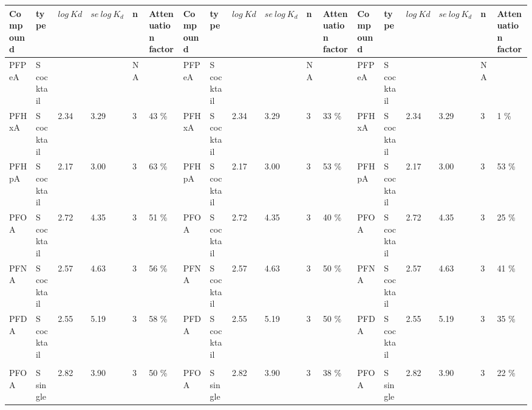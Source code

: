 \begin{sidewaystable}
{\begin{threeparttable}
\begin{tabular}{llllllllllllllllll}
         \cmidrule(l){3-6} \cmidrule(l){9-12} \cmidrule(l){15-18}
Compound & type           & $log~Kd$ & $se~log~K_d$ & n  & Attenuation factor                   & Compound & type           & $log~Kd$ & $se~log~K_d$ & n  & Attenuation factor                    & Compound & type           & $log~Kd$ & $se~log~K_d$ & n  & Attenuation factor                   \\ \midrule
PFPeA    & S cocktail    &        &           & NA &                                & PFPeA    & S cocktail    &        &           & NA &                                & PFPeA    & S cocktail    &        &           & NA &                                \\
PFHxA    & S cocktail    & 2.34   & 3.29      & 3  & 43 \%                          & PFHxA    & S cocktail    & 2.34   & 3.29      & 3  & 33 \%                          & PFHxA    & S cocktail    & 2.34   & 3.29      & 3  & 1 \%                           \\
PFHpA    & S cocktail    & 2.17   & 3.00      & 3  & 63 \%                          & PFHpA    & S cocktail    & 2.17   & 3.00      & 3  & 53 \%                          & PFHpA    & S cocktail    & 2.17   & 3.00      & 3  & 53 \%                          \\
PFOA     & S cocktail    & 2.72   & 4.35      & 3  & 51 \%                          & PFOA     & S cocktail    & 2.72   & 4.35      & 3  & 40 \%                          & PFOA     & S cocktail    & 2.72   & 4.35      & 3  & 25 \%                          \\
PFNA     & S cocktail    & 2.57   & 4.63      & 3  & 56 \%                          & PFNA     & S cocktail    & 2.57   & 4.63      & 3  & 50 \%                          & PFNA     & S cocktail    & 2.57   & 4.63      & 3  & 41 \%                          \\
PFDA     & S cocktail    & 2.55   & 5.19      & 3  & 58 \%                          & PFDA     & S cocktail    & 2.55   & 5.19      & 3  & 50 \%                          & PFDA     & S cocktail    & 2.55   & 5.19      & 3  & 35 \%                          \\
         &                &        &           &    &                                &          &                &        &           &    &                                &          &                &        &           &    &                                \\
PFOA     & S single       & 2.82   & 3.90      & 3  & 50 \%                          & PFOA     & S single       & 2.82   & 3.90      & 3  & 38 \%                          & PFOA     & S single       & 2.82   & 3.90      & 3  & 22 \%                         \\ \bottomrule

\end{tabular}
\end{threeparttable}}
\end{sidewaystable}
